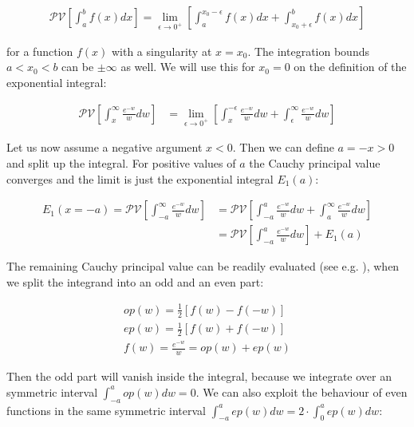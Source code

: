 \documentclass[bibliography=totocnumbered]{scrartcl}
\begin{document}
	\begin{gather}
		\mathcal{PV}\left[\int_{a}^{b}f\left(x\right)dx\right]=\lim_{\epsilon\to{}0^{+}}\left[\int_{a}^{x_0-\epsilon}f\left(x\right)dx+\int_{x_0+\epsilon}^{b}f\left(x\right)dx\right]
	\end{gather}

	for a function $f\left(x\right)$ with a singularity at $x=x_0$. The integration bounds $a<x_0<b$ can be $\pm\infty$ as well. We will use this for $x_0=0$ on the definition of the exponential integral:

	\begin{align}
		\mathcal{PV}\left[\int_{x}^{\infty}\frac{e^{-w}}{w}dw\right]&=\lim_{\epsilon\to{}0^{+}}\left[\int_{x}^{-\epsilon}\frac{e^{-w}}{w}dw+\int_{\epsilon}^{\infty}\frac{e^{-w}}{w}dw\right]
	\end{align}

	Let us now assume a negative argument $x<0$. Then we can define $a=-x>0$ and split up the integral. For positive values of $a$ the Cauchy principal value converges and the limit is just the exponential integral $E_1\left(a\right)$:
	
	\begin{align}
		E_1\left(x=-a\right)=\mathcal{PV}\left[\int_{-a}^{\infty}\frac{e^{-w}}{w}dw\right]&=\mathcal{PV}\left[\int_{-a}^{a}\frac{e^{-w}}{w}dw+\int_{a}^{\infty}\frac{e^{-w}}{w}dw\right]\\
		&=\mathcal{PV}\left[\int_{-a}^{a}\frac{e^{-w}}{w}dw\right]+E_1\left(a\right)
	\end{align}

	The remaining Cauchy principal value can be readily evaluated (see e.g. \cite{rabinowitz}), when we split the integrand into an odd and an even part:

	\begin{gather}
		op\left(w\right)=\frac{1}{2}\left[f\left(w\right)-f\left(-w\right)\right]\\
		ep\left(w\right)=\frac{1}{2}\left[f\left(w\right)+f\left(-w\right)\right]\\
		f\left(w\right)=\frac{e^{-w}}{w}=op\left(w\right)+ep\left(w\right)
	\end{gather}

	Then the odd part will vanish inside the integral, because we integrate over an symmetric interval $\int_{-a}^{a}op\left(w\right)dw=0$. We can also exploit the behaviour of even functions in the same symmetric interval $\int_{-a}^{a}ep\left(w\right)dw=2\cdot\int_{0}^{a}ep\left(w\right)dw$:
\end{document}
